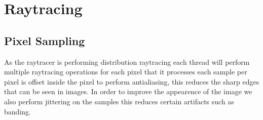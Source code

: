 \section{Raytracing}
\subsection{Pixel Sampling}
As the raytracer is performing distribution raytracing each thread will perform multiple raytracing operations for each pixel
that it processes each sample per pixel is offset inside the pixel to perform antialiasing, this reduces the sharp edges that
can be seen in images. In order to improve the appearence of the image we also perform jittering on the samples this reduces
certain artifacts such as banding. 

